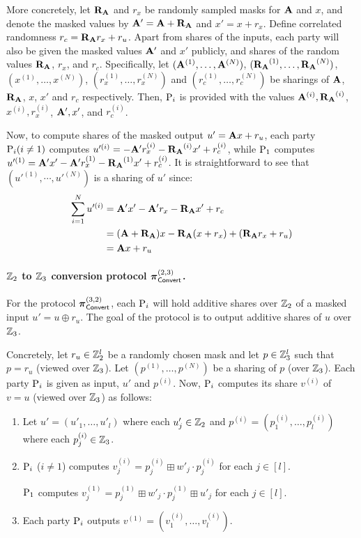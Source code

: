 More concretely, let $\mat{R_A}$ and $r_x$ be randomly sampled masks for $\mat{A}$ and $x$, and denote the masked values by $\mat{A'} = \mat{A} + \mat{R_A}$ and $x' = x + r_x$. Define correlated randomness $r_c = \mat{R_A}
r_x + r_u$. Apart from shares of the inputs, each party will also be given the masked values $\mat{A'}$ and $x'$ publicly, and shares of the random values $\mat{R_A}$, $r_x$, and $r_c$. Specifically, let $(\mat{A}^{(1)}, \dots, \mat{A}^{(N)})$, $(\mat{R_A}^{(1)}, \dots, \mat{R_A}^{(N)})$, $(x^{(1)}, \dots, x^{(N)})$, $(r_x^{(1)}, \dots, r_x^{(N)})$ and $(r_c^{(1)}, \dots, r_c^{(N)})$ be sharings of $\mat{A}$, $\mat{R_A}$, $x$, $x'$ and $r_c$ respectively. Then, $\textnormal{P}_i$ is provided with the values $\mat{A}^{(i)}, \mat{R_A}^{(i)}$, $x^{(i)}, r_x^{(i)}$, $\mat{A'}, x'$, and $r_c^{(i)}$. 

Now, to compute shares of the masked output $u' = \mat{A}x + r_u$, each party $\textnormal{P}_i (i \neq 1)$ computes $u'^{(i)} = - \mat{A'}r_x^{(i)} - \mat{R_A}^{(i)}x' + r_c^{(i)}$, while $\textnormal{P}_1$ computes $u'^{(1)} = \mat{A'}x' - \mat{A'}r_x^{(1)} - \mat{R_A}^{(1)}x' + r_c^{(i)}$. It is straightforward to see that $(u'^{(1)}, \cdots, u'^{(N)})$ is a sharing of $u'$ since:
\begin{align*}
\sum_{i=1}^N u'^{(i)} &= \mat{A'}x' - \mat{A'}r_x - \mat{R_A}x' + r_c \\
&= (\mat{A} + \mat{R_A})x - \mat{R_A}(x + r_x) + (\mat{R_A}r_x + r_u) \\
&= \mat{A}x + r_u
\end{align*}


\paragraph{$\mathbb{Z}_2$ to $\mathbb{Z}_3$ conversion protocol $\boldsymbol{\pi}_{\textsf{Convert}}^{(2,3)}$.}
For the protocol $\boldsymbol{\pi}_{\textsf{Convert}}^{(3,2)}$, each $\textnormal{P}_i$ will hold additive shares over $\mathbb{Z}_2$ of a masked input $u' = u \oplus r_u$. The goal of the protocol is to output additive shares of $u$ over $\mathbb{Z}_3$. 

Concretely, let $r_u \in \mathbb{Z}_2^l$ be a randomly chosen mask and let $p \in \mathbb{Z}_3^l$ such that $p = r_u$ (viewed over $\mathbb{Z}_3$). Let $(p^{(1)}, \dots, p^{(N)})$ be a sharing of $p$ (over $\mathbb{Z}_3$). Each party $\textnormal{P}_i$ is given as input, $u'$ and $p^{(i)}$. Now, $\textnormal{P}_i$ computes its share $v^{(i)}$ of $v = u$ (viewed over $\mathbb{Z}_3$) as follows:

\begin{enumerate}
    \item Let $u' = (u'_1, \dots, u'_l)$ where each $u'_j \in \mathbb{Z}_2$ and $p^{(i)} = (p^{(i)}_1, \dots, p^{(i)}_l)$ where each $p^{(i)}_j \in \mathbb{Z}_3$. 


    \item $\textnormal{P}_i$ ($i \neq 1$) computes $v^{(i)}_j = p^{(i)}_j \boxplus w'_j \cdot p^{(i)}_j$ for each $j \in [l]$.

    $\textnormal{P}_1$ computes $v^{(1)}_j = p^{(1)}_j \boxplus w'_j \cdot p^{(1)}_j \boxplus u'_j$ for each $j \in [l]$.

    \item Each party $\textnormal{P}_i$ outputs $v^{(1)} = (v^{(i)}_1, \dots, v^{(i)}_l)$.
\end{enumerate}

